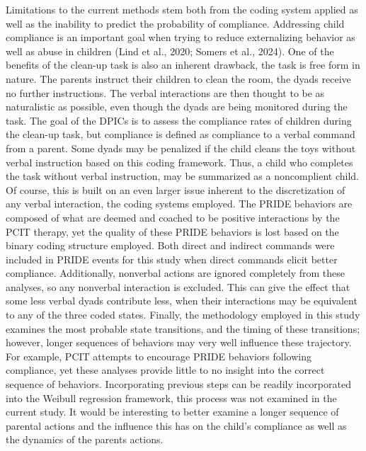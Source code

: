 \documentclass[12pt]{./styles/outhesis}
\begin{document}
Limitations to the current methods stem both from the coding system
applied as well as the inability to predict the probability of compliance.
Addressing child compliance is an important goal when trying to reduce
externalizing behavior as well as abuse in children (Lind et al., 2020;
Somers et al., 2024). One of the benefits of the clean-up task is also
an inherent drawback, the task is free form in nature. The parents
instruct their children to clean the room, the dyads receive no
further instructions. The verbal interactions are then thought to be as
naturalistic as possible, even though the dyads are being monitored
during the task. The goal of the DPICs is to assess the compliance rates
of children during the clean-up task, but compliance is defined as
compliance to a verbal command from a parent. Some dyads may be
penalized if the child cleans the toys without verbal instruction based
on this coding framework. Thus, a child who completes the task without
verbal instruction, may be summarized as a noncomplient child. Of
course, this is built on an even larger issue inherent to the
discretization of any verbal interaction, the coding systems employed.
The PRIDE behaviors are composed of what are deemed and coached to be
positive interactions by the PCIT therapy, yet the quality of these
PRIDE behaviors is lost based on the binary coding structure employed.
Both direct and indirect commands were included in PRIDE events for this
study when direct commands elicit better compliance. Additionally,
nonverbal actions are ignored completely from these analyses, so any
nonverbal interaction is excluded. This can give the effect that some less verbal dyads
contribute less, when their interactions may be equivalent to any of the
three coded states. Finally, the methodology employed in this study
examines the most probable state transitions, and the timing of these
transitions; however, longer sequences of behaviors may very well
influence these trajectory. For example, PCIT attempts to encourage PRIDE behaviors following compliance, yet these analyses provide little to no insight into the correct sequence of behaviors. Incorporating previous steps can be readily
incorporated into the Weibull regression framework, this process was not
examined in the current study. It would be interesting to better examine
a longer sequence of parental actions and the influence this has on the
child's compliance as well as the dynamics of the parents actions.
\end{document}
